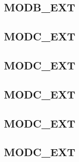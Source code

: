 \documentclass{unirExamen}
\begin{document}
\subsection{MODB\_EXT}

\subsection{MODC\_EXT}

\subsection{MODC\_EXT}

\subsection{MODC\_EXT}
%
\subsection{MODC\_EXT}

\subsection{MODC\_EXT}

\end{document}
